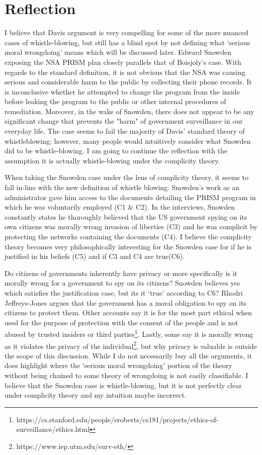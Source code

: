 \documentclass[12pt]{article}
\begin{document}
\section{Reflection}
I believe that Davis argument is very compelling for some of the more nuanced
cases of whistle-blowing, but still has a blind spot by not defining what
`serious moral wrongdoing' means which will be discussed later. Edward Snowden
exposing the NSA PRISM plan closely parallels that of Boisjoly's case. With
regards to the standard definition, it is not obvious that the NSA was causing
serious and considerable harm to the public by collecting their phone records.
It is inconclusive whether he attempted to change the program from the inside
before leaking the program to the public or other internal procedures of
remediation.  Moreover, in the wake of Snowden, there does not appear to be any
significant change that prevents the "harm" of government surveillance in our
everyday life.  The case seems to fail the majority of Davis' standard theory of
whistleblowing; however, many people would intuitively consider what Snowden did
to be whistle-blowing. I am going to continue the reflection with the assumption
it is actually whistle-blowing under the complicity theory.

When taking the Snowden case under the lens of complicity theory, it seems to
fall in-line with the new definition of whistle blowing. Snowden's work as an
administrator gave him access to the documents detailing the PRISM program in
which he was voluntarily employed (C1 \& C2). In the interviews, Snowden
constantly states he thoroughly believed that the US government spying on its
own citizens was morally wrong invasion of liberties (C3) and he was complicit
by protecting the networks containing the documents (C4). I believe the
complicity theory becomes very philosophically interesting for the Snowden case
for if he is justified in his beliefs (C5) and if C3 and C4 are true(C6).

Do citizens of governments inherently have privacy or more specifically is it
morally wrong for a government to spy on its citizens? Snowden believes yes
which satisfies the justification case, but its it `true' according to C6?
Rhodri Jeffreys-Jones argues that the government has a moral obligation to spy
on its citizens to protect them. Other accounts say it is for the most part
ethical when used for the purpose of protection with the consent of the people
and is not abused by trusted insiders or third
parties\footnote{https://cs.stanford.edu/people/eroberts/cs181/projects/ethics-of-surveillance/ethics.html}.
Lastly, some say it is morally wrong as it violates the privacy of the
individual\footnote{https://www.iep.utm.edu/surv-eth/}, but why privacy is
valuable is outside the scope of this discussion. While I do not necessarily buy
all the arguments, it does highlight where the `serious moral wrongdoing'
portion of the theory without being chained to some theory of wrongdoing is not
easily classifiable. I believe that the Snowden case is whistle-blowing, but it
is not perfectly clear under complicity theory and my intuition maybe incorrect.
\end{document}
